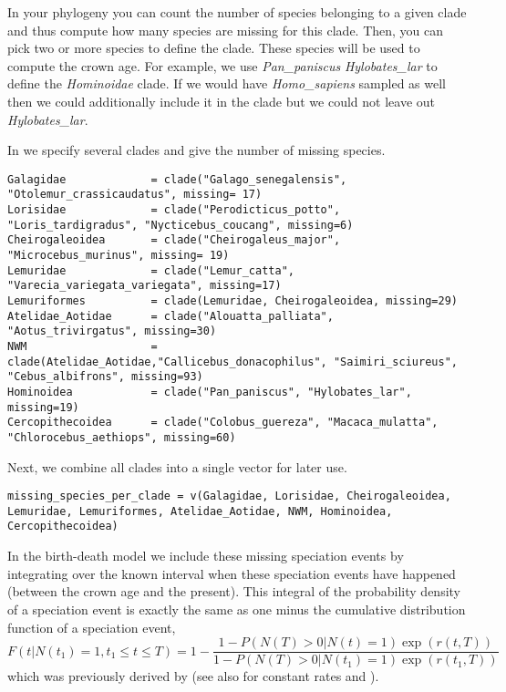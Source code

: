 In your phylogeny you can count the number of species belonging to a given clade and thus compute how many species are missing for this clade.
Then, you can pick two or more species to define the clade.
These species will be used to compute the crown age.
For example, we use \emph{Pan\_paniscus} \emph{Hylobates\_lar} to define the \emph{Hominoidae} clade.
If we would have \emph{Homo\_sapiens} sampled as well then we could additionally include it in the clade but we could not leave out \emph{Hylobates\_lar}.

In \Rev we specify several clades and give the number of missing species.
{\tt \begin{snugshade*}
\begin{lstlisting}
Galagidae             = clade("Galago_senegalensis",  "Otolemur_crassicaudatus", missing= 17)
Lorisidae             = clade("Perodicticus_potto", "Loris_tardigradus", "Nycticebus_coucang", missing=6)
Cheirogaleoidea       = clade("Cheirogaleus_major", "Microcebus_murinus", missing= 19)
Lemuridae             = clade("Lemur_catta", "Varecia_variegata_variegata", missing=17)
Lemuriformes          = clade(Lemuridae, Cheirogaleoidea, missing=29)
Atelidae_Aotidae      = clade("Alouatta_palliata", "Aotus_trivirgatus", missing=30)
NWM                   = clade(Atelidae_Aotidae,"Callicebus_donacophilus", "Saimiri_sciureus", "Cebus_albifrons", missing=93)
Hominoidea            = clade("Pan_paniscus", "Hylobates_lar", missing=19)
Cercopithecoidea      = clade("Colobus_guereza", "Macaca_mulatta", "Chlorocebus_aethiops", missing=60)
\end{lstlisting}
\end{snugshade*}}
Next, we combine all clades into a single vector for later use.
{\tt \begin{snugshade*}
\begin{lstlisting}
missing_species_per_clade = v(Galagidae, Lorisidae, Cheirogaleoidea, Lemuridae, Lemuriformes, Atelidae_Aotidae, NWM, Hominoidea, Cercopithecoidea)
\end{lstlisting}
\end{snugshade*}}

In the birth-death model we include these missing speciation events by integrating over the known interval when these speciation events have happened (between the crown age and the present).
This integral of the probability density of a speciation event is exactly the same as one minus the cumulative distribution function of a speciation event, 
\begin{equation}
F(t|N(t_1)=1,t_1\leq t \leq T) = 1 - \frac{1-P(N(T)>0|N(t)=1)\exp{(r(t,T))}}{1-P(N(T)>0|N(t_1)=1)\exp{(r(t_1,T))}} \label{spec_dist}
\end{equation}
which was previously derived by \citet[Equation~(6)]{Hoehna2014a} (see also \citet[Equation~(3)]{Yang1997} for constant rates and \citet[Equation~(8)]{Hoehna2013}).


